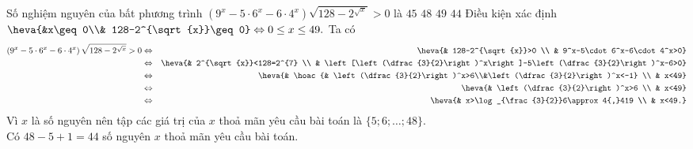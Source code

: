 \begin{ex}%
	Số nghiệm nguyên của bất phương trình $\left(9^x-5\cdot 6^x-6\cdot 4^x\right)\sqrt{128-2^{\sqrt{x}}}>0$ là
	\choice
	{$45$}
	{$48$}
	{$49$}
	{\True $44$}
	\loigiai
	{
		Điều kiện xác định $\heva{&x\geq 0\\& 128-2^{\sqrt{x}}\geq 0}\Leftrightarrow 0\leq x\leq 49.$
		Ta có 
		\begin{eqnarray*}
			\left(9^x-5\cdot 6^x-6\cdot 4^x\right)\sqrt{128-2^{\sqrt{x}}}>0&\Leftrightarrow& \heva{& 128-2^{\sqrt{x}}>0 \\ & 9^x-5\cdot 6^x-6\cdot 4^x>0}\\
			&\Leftrightarrow & \heva{& 2^{\sqrt{x}}<128=2^{7} \\ & \left[\left(\dfrac{3}{2}\right)^x\right]-5\left(\dfrac{3}{2}\right)^x-6>0}\\
			&\Leftrightarrow & \heva{& \hoac{& \left(\dfrac{3}{2}\right)^x>6\\&\left(\dfrac{3}{2}\right)^x<-1} \\ & x<49}\\
			&\Leftrightarrow &\heva{& \left(\dfrac{3}{2}\right)^x>6 \\ & x<49}\\
			&\Leftrightarrow &\heva{& x>\log_{\frac{3}{2}}6\approx 4{,}419 \\ & x<49.}
		\end{eqnarray*}
		Vì $x$ là số nguyên nên tập các giá trị của $x$ thoả mãn yêu cầu bài toán là $\{5;6;\ldots;48\}$.\\
		Có $48-5+1=44$ số nguyên $x$ thoả mãn yêu cầu bài toán.
	}
\end{ex}

